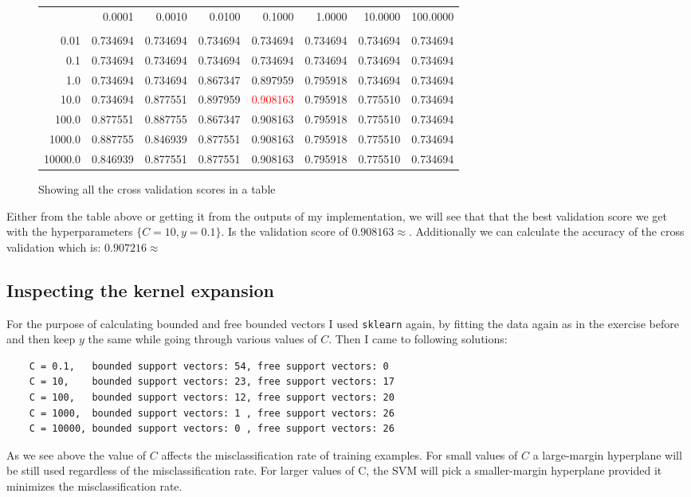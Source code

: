 \newpage
\begin{figure}[!htpb]
\begin{tabular}{rrrrrrrr}
\toprule
  & 0.0001   &  0.0010   &  0.0100   &  0.1000   &  1.0000   &  10.0000  &  100.0000 \\
  &         &           &           &           &           &           &           \\
\midrule
 0.01 & 0.734694 &  0.734694 &  0.734694 &  0.734694 &  0.734694 &  0.734694 &  0.734694 \\
 0.1 & 0.734694 &  0.734694 &  0.734694 &  0.734694 &  0.734694 &  0.734694 &  0.734694 \\
 1.0 & 0.734694 &  0.734694 &  0.867347 &  0.897959 &  0.795918 &  0.734694 &  0.734694 \\
 10.0 & 0.734694 &  0.877551 &  0.897959 &  \textcolor{red}{0.908163} &  0.795918 &  0.775510 &  0.734694 \\
 100.0 & 0.877551 &  0.887755 &  0.867347 &  0.908163 &  0.795918 &  0.775510 &  0.734694 \\
 1000.0 & 0.887755 &  0.846939 &  0.877551 &  0.908163 &  0.795918 &  0.775510 &  0.734694 \\
 10000.0 & 0.846939 &  0.877551 &  0.877551 &  0.908163 &  0.795918 &  0.775510 &  0.734694 \\
\bottomrule
\end{tabular}
\caption{Showing all the cross validation scores in a table}
\end{figure}


Either from the table above or getting it from the outputs of my implementation, we will see that that the best validation score we get with the hyperparameters $\{C=10,y=0.1\}$.
Is the validation score of $0.908163\approx$.
Additionally we can calculate the accuracy of the cross validation which is: $0.907216\approx$

\subsection{Inspecting the kernel expansion}
For the purpose of calculating bounded and free bounded vectors I used \texttt{sklearn} again, by fitting the data again as in the exercise before and then keep $y$ the same while going through various values of $C$.
Then I came to following solutions:
\begin{verbatim}
	C = 0.1,   bounded support vectors: 54, free support vectors: 0
	C = 10,    bounded support vectors: 23, free support vectors: 17
	C = 100,   bounded support vectors: 12, free support vectors: 20
	C = 1000,  bounded support vectors: 1 , free support vectors: 26
	C = 10000, bounded support vectors: 0 , free support vectors: 26 
\end{verbatim}
As we see above the value of $C$ affects the misclassification rate of training examples. For small values of $C$ a large-margin hyperplane will be still used regardless of the misclassification rate.
For larger values of C, the SVM will pick a smaller-margin hyperplane provided it minimizes the misclassification rate.

